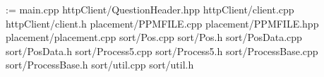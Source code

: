 \documentclass[a4j]{jarticle}
\begin{document}
\setlength{\columnsep}{40pt}


  \makeatletter
  \@tfor\xx@t:=
  {main.cpp}
  {httpClient/QuestionHeader.hpp}
  {httpClient/client.cpp}
  {httpClient/client.h}
  {placement/PPMFILE.cpp}
  {placement/PPMFILE.hpp}
  {placement/placement.cpp}
  {sort/Pos.cpp}
  {sort/Pos.h}
  {sort/PosData.cpp}
  {sort/PosData.h}
  {sort/Process5.cpp}
  {sort/Process5.h}
  {sort/ProcessBase.cpp}
  {sort/ProcessBase.h}
  {sort/util.cpp}
  {sort/util.h}
  \makeatother
\end{document}

